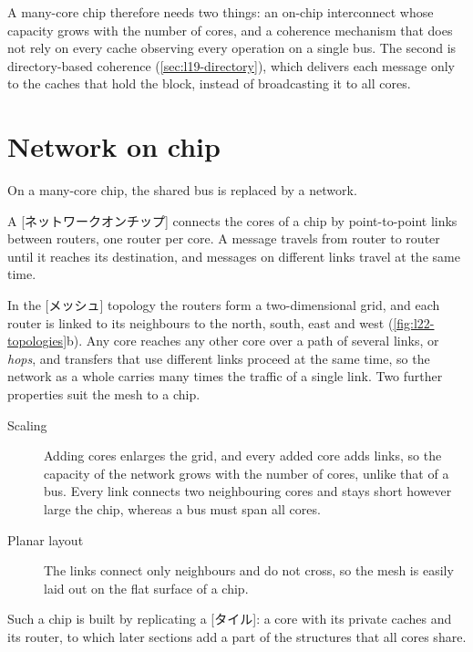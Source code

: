 \documentclass[../main.tex]{subfiles}
\begin{document}
A many-core chip therefore needs two things: an on-chip interconnect whose
capacity grows with the number of cores, and a coherence mechanism that
does not rely on every cache observing every operation on a single bus.
The second is directory-based coherence (\cref{sec:l19-directory}), which
delivers each message only to the caches that hold the block, instead of
broadcasting it to all cores.

\section{Network on chip}
\label{sec:l22-noc}

On a many-core chip, the shared bus is replaced by a network.

\begin{definition}
  A [ネットワークオンチップ] connects the cores of a
  chip by point-to-point links between routers, one router per core.  A
  message travels from router to router until it reaches its destination,
  and messages on different links travel at the same time.
\end{definition}

In the [メッシュ] topology the routers form a two-dimensional
grid, and each router is linked to its neighbours to the north, south, east
and west (\cref{fig:l22-topologies}b).  Any core reaches any other core over
a path of several links, or \emph{hops}, and transfers that use different
links proceed at the same time, so the network as a whole carries many
times the traffic of a single link.  Two further properties suit the mesh to
a chip.
\begin{description}
  \item[Scaling] Adding cores enlarges the grid, and every added core adds
    links, so the capacity of the network grows with the number of cores,
    unlike that of a bus.  Every link connects two neighbouring cores and
    stays short however large the chip, whereas a bus must span all cores.
  \item[Planar layout] The links connect only neighbours and do not cross,
    so the mesh is easily laid out on the flat surface of a chip.
\end{description}
Such a chip is built by replicating a [タイル]: a core with its
private caches and its router, to which later sections add a part of the
structures that all cores share.
\end{document}
